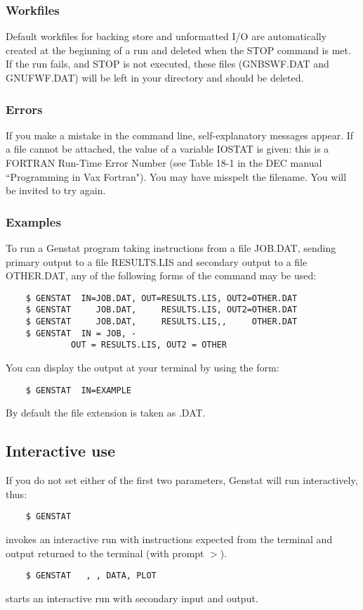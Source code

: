 \subsubsection{Workfiles}

Default workfiles for backing store and unformatted I/O are automatically
created at the beginning of a run and deleted when the STOP command is met.
If the run fails, and STOP is not executed, these files (GNBSWF.DAT and
GNUFWF.DAT) will be left in your directory and should be deleted.

\subsubsection{Errors}

If you make a mistake in the command line, self-explanatory messages appear.
If a file cannot be attached, the value of a variable IOSTAT is given: this is
a FORTRAN Run-Time Error Number (see Table 18-1 in the DEC manual ``Programming
in Vax Fortran").
You may have misspelt the filename.
You will be invited to try again.

\subsubsection{Examples}

To run a Genstat program taking instructions from a file JOB.DAT, sending
primary output to a file RESULTS.LIS and secondary output to a file OTHER.DAT,
any of the following forms of the command may be used:
\begin{verbatim}
    $ GENSTAT  IN=JOB.DAT, OUT=RESULTS.LIS, OUT2=OTHER.DAT
    $ GENSTAT     JOB.DAT,     RESULTS.LIS, OUT2=OTHER.DAT
    $ GENSTAT     JOB.DAT,     RESULTS.LIS,,     OTHER.DAT
    $ GENSTAT  IN = JOB, -
             OUT = RESULTS.LIS, OUT2 = OTHER
\end{verbatim}
You can display the output at your terminal by using the form:
\begin{verbatim}
    $ GENSTAT  IN=EXAMPLE
\end{verbatim}
By default the file extension is taken as .DAT.

\subsection{Interactive use}

If you do not set either of the first two parameters, Genstat will run
interactively, thus:
\begin{verbatim}
    $ GENSTAT
\end{verbatim}
invokes an interactive run with instructions expected from the terminal
and output returned to the terminal (with prompt $>$).
\begin{verbatim}
    $ GENSTAT   , , DATA, PLOT
\end{verbatim}
starts an interactive run with secondary input and output.

